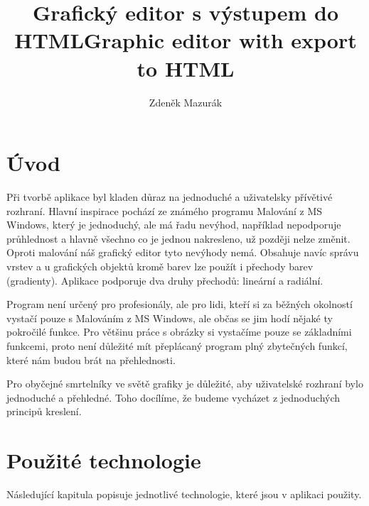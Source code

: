 \documentclass[
  field=inf,
  biblatex,
  glossaries,
  index
]{kidiplom}
\title{Grafický editor s výstupem do HTML}
\title[english]{Graphic editor with export to HTML}
\subtitle{}
\subtitle[english]{}
\author{Zdeněk Mazurák}
\begin{document}
\maketitle



\newcommand{\BibLaTeX}{\textsc{Bib}\LaTeX}

\section{Úvod}

Při tvorbě aplikace byl kladen důraz na jednoduché a uživatelsky přívětivé rozhraní. Hlavní inspirace pochází ze známého programu Malování z MS Windows, který je jednoduchý, ale má řadu nevýhod, například nepodporuje průhlednost a hlavně všechno co je jednou nakresleno, už později nelze změnit. Oproti malování náš grafický editor tyto nevýhody nemá. Obsahuje navíc správu vrstev a u grafických objektů kromě barev lze použít i přechody barev (gradienty). Aplikace podporuje dva druhy přechodů: lineární a radiální.

Program není určený pro profesionály, ale pro lidi, kteří si za běžných okolností vystačí pouze s Malováním z MS Windows, ale občas se jim hodí nějaké ty pokročilé funkce. Pro většinu práce s obrázky si vystačíme pouze se základními funkcemi, proto není důležité mít přeplácaný program plný zbytečných funkcí, které nám budou brát na přehlednosti.

Pro obyčejné smrtelníky ve světě grafiky je důležité, aby uživatelské rozhraní bylo jednoduché a přehledné. Toho docílíme, že budeme vycházet z jednoduchých principů kreslení.

\newpage

\section{Použité technologie}

Následující kapitula popisuje jednotlivé technologie, které jsou v aplikaci použity.
\end{document}
